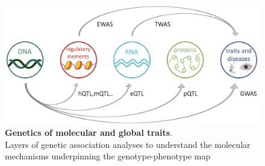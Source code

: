 





\begin{figure}[h]
\centering
\includegraphics[width=15cm]{Chapter1/Fig/layers_of_genetic_associations_draft.png}
\caption[Genetics of molecular and global traits]{\textbf{Genetics of molecular and global traits}.\\
Layers of genetic association analyses to understand the molecular mechanisms underpinning the genotype-phenotype map}
\label{fig:molecular_genetic_associations}
\end{figure}


